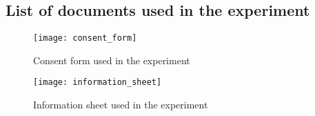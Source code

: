

\begin{appendices}
  \chapter{List of documents used in the experiment}

  \begin{figure}[h]
  \texttt{[image: consent\_form]}
  \caption{Consent form used in the experiment}
  \label{fig:consentForm}
  \end{figure}

  \begin{figure}[h]
  \texttt{[image: information\_sheet]}
  \caption{Information sheet used in the experiment}
  \label{fig:InformationSheet}
  \end{figure}

\end{appendices}
